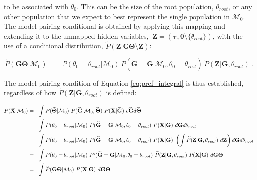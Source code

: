 \documentclass[11pt]{article}
\newcommand{\vect}[1]{\boldsymbol{\mathbf{#1}}}
\newcommand{\X}{\vect{X}}
\newcommand{\M}{\mathcal{M}}
\newcommand{\G}{\vect{G}}
\newcommand{\T}{\vect{\Theta}}
\newcommand{\GT}{\G\T}
\newcommand{\Pref}{\widetilde{P}}
\newcommand{\Gref}{\widetilde{\G}}
\newcommand{\Tref}{\widetilde{\T}}
\newcommand{\1}{\mathbbm{1}}
\newcommand{\Z}{\vect{Z}}
\newcommand{\troot}{\theta_{root}}
\newcommand{\taus}{\vect\tau}
\newcommand{\thetas}{\vect\theta}
\begin{document}
to be associated with $\theta_0$. This can be the size of the root population, $\troot$, or any other population
that we expect to best represent the single population in $\M_0$.
%
The model pairing conditional is obtained by applying this mapping and extending it to the unmapped hidden variables, $~ \Z=(\taus,\thetas\setminus \{\troot\})$, with the use of a conditional distribution, $\Pref(\Z|\GT\setminus\Z)$:
%
%
\begin{small}
\begin{equation}
 \Pref(\GT|\M_0)  ~~=~~
 P(\theta_0=\troot|\M_0)\ P(\Gref=\G|\M_0,\theta_0=\troot)\ \Pref(\Z|\G,\troot)   ~ .\label{eq:pref_null}
\end{equation}
\end{small}
%
%
The model-pairing condition of Equation \ref{eq:pref_integral} is thus established, regardless of how $\Pref(\Z|\G,\troot)$ is defined:
%
%
\begin{small}
\begin{align}
P(\X|\M_0)
&=~~ \int P(\Tref|\M_0)\ P(\Gref|\M_0,\Tref)\ P(\X|\Gref)\   d\Gref d\Tref  \notag \\ %
&=~~ \int P(\theta_0=\troot|\M_0)\ P(\Gref=\G|\M_0,\theta_0=\troot)\ P(\X|\G)\  d\G d\troot \notag \\ 
&=~~ \int P(\theta_0=\troot|\M_0)\ P(\Gref=\G|\M_0,\theta_0=\troot)\ P(\X|\G)\
\left( \int \Pref(\Z|\G,\troot)\ d\Z \right) d\G d\troot \notag \\ 
%
&=~~ \int P(\theta_0=\troot|\M_0)\ P`(\Gref=\G|\M_0,\theta_0=\troot)\ \Pref(\Z|\G,\troot)\ P(\X|\G)\ d\GT \notag \\ 
&=~~ \int \Pref(\GT|\M_0)\ P(\X|\G)\ d\GT ~. \label{eq:likelihood_null} %
\end{align}
\end{small}
\end{document}
